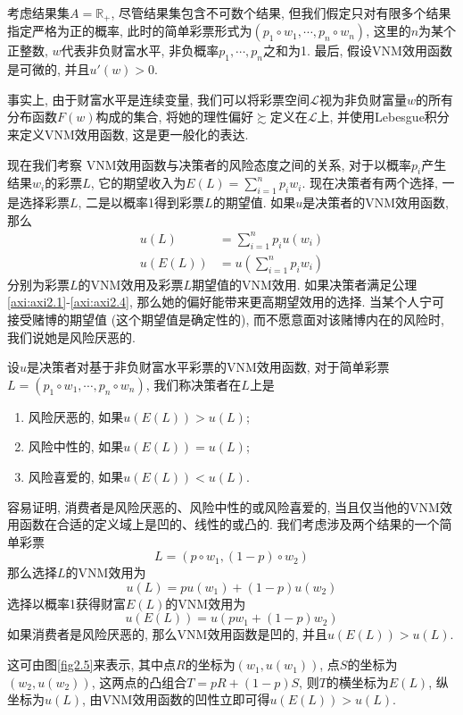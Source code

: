 \documentclass[cn, 12pt, math=mtpro2, bibstyle=apa, blue]{elegantbook}
\newcommand{\R}{\mathbb{R}}
\begin{document}
考虑结果集$A=\R_+$, 尽管结果集包含不可数个结果, 但我们假定只对有限多个结果指定严格为正的概率, 此时的简单彩票形式为$(p_1\circ w_1,\cdots,p_n\circ w_n)$, 这里的$n$为某个正整数, $w$代表非负财富水平, 非负概率$p_1,\cdots,p_n$之和为1. 最后, 假设VNM效用函数是可微的, 并且$u'(w)>0$.

\begin{remark}
事实上, 由于财富水平是连续变量, 我们可以将彩票空间$\mathscr{L}$视为非负财富量$w$的所有分布函数$F(w)$构成的集合, 将她的理性偏好$\succsim$定义在$\mathscr{L}$上, 并使用Lebesgue积分来定义VNM效用函数, 这是更一般化的表达.
\end{remark}

现在我们考察 VNM效用函数与决策者的风险态度之间的关系, 对于以概率$p_i$产生结果$w_i$的彩票$L$, 它的期望收入为$E(L)=\sum_{i=1}^{n}p_iw_i$. 现在决策者有两个选择, 一是选择彩票$L$, 二是以概率1得到彩票$L$的期望值. 如果$u$是决策者的VNM效用函数, 那么
\begin{align*}
u(L)&=\sum_{i=1}^{n}p_iu(w_i) \\
u(E(L))&=u\left(\sum_{i=1}^{n}p_iw_i\right)
\end{align*}
分别为彩票$L$的VNM效用及彩票$L$期望值的VNM效用. 如果决策者满足公理\ref{axi:axi2.1}-\ref{axi:axi2.4}, 那么她的偏好能带来更高期望效用的选择. 当某个人宁可接受赌博的期望值 (这个期望值是确定性的), 而不愿意面对该赌博内在的风险时, 我们说她是风险厌恶的.

\begin{definition}[风险态度的分类]
设$u$是决策者对基于非负财富水平彩票的VNM效用函数, 对于简单彩票$L=(p_1\circ w_1,\cdots, p_n\circ w_n)$, 我们称决策者在$L$上是
\begin{enumerate}[\arabic*.]
  \item 风险厌恶的, 如果$u(E(L))>u(L)$;
  \item 风险中性的, 如果$u(E(L))=u(L)$;
  \item 风险喜爱的, 如果$u(E(L))<u(L)$.
\end{enumerate}
\end{definition}
容易证明, 消费者是风险厌恶的、风险中性的或风险喜爱的, 当且仅当他的VNM效用函数在合适的定义域上是凹的、线性的或凸的. 我们考虑涉及两个结果的一个简单彩票
$$L=(p\circ w_1,(1-p)\circ w_2)$$
那么选择$L$的VNM效用为
$$u(L)=pu(w_1)+(1-p)u(w_2)$$
选择以概率1获得财富$E(L)$的VNM效用为
$$u(E(L))=u(pw_1+(1-p)w_2)$$
如果消费者是风险厌恶的, 那么VNM效用函数是凹的, 并且$u(E(L))>u(L)$. 

这可由图\ref{fig2.5}来表示, 其中点$R$的坐标为$(w_1,u(w_1))$, 点$S$的坐标为$(w_2,u(w_2))$, 这两点的凸组合$T=pR+(1-p)S$, 则$T$的横坐标为$E(L)$, 纵坐标为$u(L)$, 由VNM效用函数的凹性立即可得$u(E(L))>u(L)$.
\end{document}
